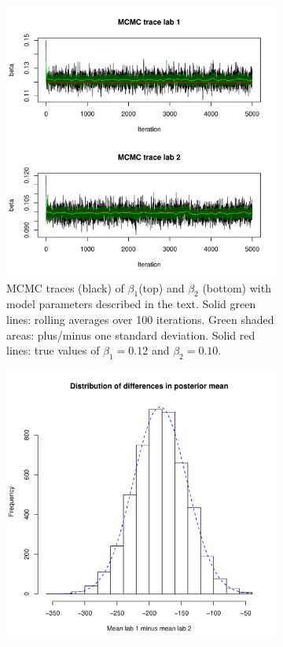 \documentclass{article}
\begin{document}
\begin{figure}[h]
	\centering
	\begin{subfigure}[t]{0.47\linewidth}
		\centering
		\includegraphics[width=1.0 \linewidth,trim={0 20 10 20}, clip=true]{figs/MCMC_traces.pdf}
		\caption{MCMC traces (black) of $\beta_1$(top) and $\beta_2$ (bottom) with model parameters described in the text. Solid green lines: rolling averages over 100 iterations. Green shaded areas: plus/minus one standard deviation. Solid red lines: true values of $\beta_1 = 0.12$ and $\beta_2 = 0.10$.}
		\label{fig:MCMC}
	\end{subfigure}
	\hfill
	\begin{subfigure}[t]{0.47\linewidth}
		\centering
		\includegraphics[width=1.0 \linewidth,trim={0 20 10 20}, clip=true]{figs/MCMC_hist_diff.pdf}

\end{subfigure}
\end{figure}
\end{document}

